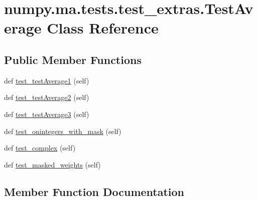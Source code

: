 \hypertarget{classnumpy_1_1ma_1_1tests_1_1test__extras_1_1TestAverage}{}\section{numpy.\+ma.\+tests.\+test\+\_\+extras.\+Test\+Average Class Reference}
\label{classnumpy_1_1ma_1_1tests_1_1test__extras_1_1TestAverage}
\subsection*{Public Member Functions}
\begin{DoxyCompactItemize}
\item 
def \hyperlink{classnumpy_1_1ma_1_1tests_1_1test__extras_1_1TestAverage_a8180ea70bf7c3e544e96181a0d72fdc4}{test\+\_\+test\+Average1} (self)
\item 
def \hyperlink{classnumpy_1_1ma_1_1tests_1_1test__extras_1_1TestAverage_a32cfa42765c38c86343a9c922acdaf0b}{test\+\_\+test\+Average2} (self)
\item 
def \hyperlink{classnumpy_1_1ma_1_1tests_1_1test__extras_1_1TestAverage_a43750cbc80798940a8dca0e344fdaa0c}{test\+\_\+test\+Average3} (self)
\item 
def \hyperlink{classnumpy_1_1ma_1_1tests_1_1test__extras_1_1TestAverage_a100bb7221aeea1158a6137eb8b27a816}{test\+\_\+onintegers\+\_\+with\+\_\+mask} (self)
\item 
def \hyperlink{classnumpy_1_1ma_1_1tests_1_1test__extras_1_1TestAverage_ae609cd9acd179affc6cc8ee89991b646}{test\+\_\+complex} (self)
\item 
def \hyperlink{classnumpy_1_1ma_1_1tests_1_1test__extras_1_1TestAverage_a02a29cb7c62bfb40b9431024a3498f64}{test\+\_\+masked\+\_\+weights} (self)
\end{DoxyCompactItemize}


\subsection{Member Function Documentation}
\mbox{\label{classnumpy_1_1ma_1_1tests_1_1test__extras_1_1TestAverage_ae609cd9acd179affc6cc8ee89991b646}} 
